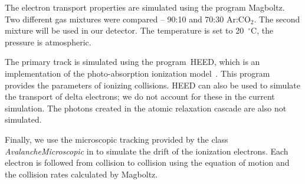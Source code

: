 		The electron transport properties are simulated using the program Magboltz. Two different gas mixtures were compared -- 90:10 and 70:30 Ar:CO$_2$. The second mixture will be used in our detector. The temperature is set to 20~$^\circ$C, the pressure is atmospheric.
		
		The primary track is simulated using the program~\ac{HEED}, which is an implementation of the photo-absorption ionization model~\cite{HEED}. This program provides the parameters of ionizing collisions. \ac{HEED} can also be used to simulate the transport of delta electrons; we do not account for these in the current simulation. The photons created in the atomic relaxation cascade are also not simulated.
		
		Finally, we use the microscopic tracking provided by the class \textit{AvalancheMicroscopic} in \garfieldpp to simulate the drift of the ionization electrons. Each electron is followed from collision to collision using the equation of motion and the collision rates calculated by Magboltz.
		
		
